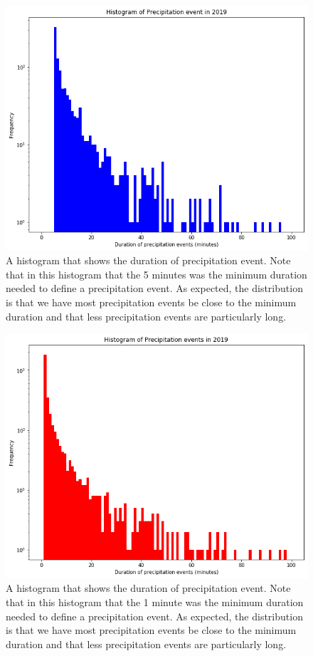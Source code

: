 \documentclass[12pt]{article}
\begin{document}
\begin{figure}[h]
	\centering
	\includegraphics[width=150mm]{precip_hist_5min.png}
	\caption{A histogram that shows the duration of precipitation event. Note that in this histogram that the 5 minutes was the minimum duration needed to define a precipitation event. As expected, the distribution is that we have most precipitation events be close to the minimum duration and that less precipitation events are particularly long. }
\end{figure}
\begin{figure}[h]
	\centering
	\includegraphics[width=150mm]{precip_hist_1min.png}
	\caption{A histogram that shows the duration of precipitation event. Note that in this histogram that the 1 minute was the minimum duration needed to define a precipitation event. As expected, the distribution is that we have most precipitation events be close to the minimum duration and that less precipitation events are particularly long. }
\end{figure}
\end{document}
